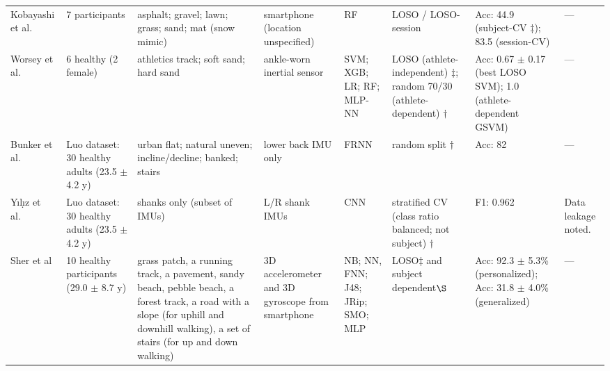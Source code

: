 \begin{landscape}
\begin{longtable}{@{}P{2.cm} P{3.cm} P{3.cm} P{3.cm} P{2.cm} P{2.5cm} P{2.5cm} P{3.cm}@{}}
\addlinespace
Kobayashi et al.~\cite{kobayashi2019estimation} & 7 participants & asphalt; gravel; lawn; grass; sand; mat (snow mimic) & smartphone (location unspecified) & RF & LOSO / LOSO-session & Acc: 44.9 (subject-CV \(\ddagger\)); 83.5 (session-CV) & --- \\
\addlinespace
Worsey et al.~\cite{worsey2021automatic} & 6 healthy (2 female) & athletics track; soft sand; hard sand & ankle-worn inertial sensor & SVM; XGB; LR; RF; MLP-NN & LOSO (athlete-independent) \(\ddagger\); random 70/30 (athlete-dependent) \(\dagger\) & Acc: 0.67 $\pm$ 0.17 (best LOSO SVM); 1.0 (athlete-dependent GSVM) & --- \\
\addlinespace
Bunker et al.~\cite{bunker2021towards} & Luo dataset: 30 healthy adults (23.5 $\pm$ 4.2 y) & urban flat; natural uneven; incline/decline; banked; stairs & lower back IMU only & FRNN & random split \(\dagger\) & Acc: 82 & --- \\
\addlinespace
Y\i l\d\i z et al.~\cite{yildiz2023towards} & Luo dataset: 30 healthy adults (23.5 $\pm$ 4.2 y) & shanks only (subset of IMUs) & L/R shank IMUs & CNN & stratified CV (class ratio balanced; not subject) \(\dagger\) & F1: 0.962 & Data leakage noted. \\
\addlinespace
Sher et al~\cite{sher2023towards} & 10 healthy participants (29.0 $\pm$ 8.7 y) & grass patch, a running track, a pavement, sandy beach, pebble beach, a forest track, a road with a slope (for uphill and downhill walking), a set of stairs (for up and down walking) & 3D accelerometer and 3D gyroscope from smartphone & NB; NN, FNN; J48; JRip; SMO; MLP & LOSO\(\ddagger\) and subject dependent\(\S\) & Acc: 92.3 $\pm$ 5.3\% (personalized); Acc: 31.8 $\pm$ 4.0\% (generalized) & --- \\



\end{longtable}
\end{landscape}
